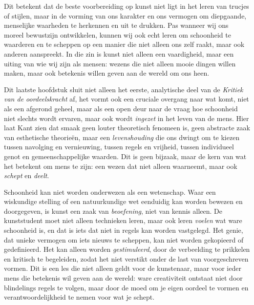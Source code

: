 \begin{mdframed}[leftmargin=0pt,rightmargin=0pt,backgroundcolor=blue!6,linecolor=white,innertopmargin=6pt,innerbottommargin=6pt]
Dit betekent dat de beste voorbereiding op kunst niet ligt in het leren van trucjes of stijlen, maar in de vorming van ons karakter en ons vermogen om diepgaande, menselijke waarheden te herkennen en uit te drukken. Pas wanneer wij ons moreel bewustzijn ontwikkelen, kunnen wij ook echt leren om schoonheid te waarderen en te scheppen op een manier die niet alleen ons zelf raakt, maar ook anderen aanspreekt. In die zin is kunst niet alleen een vaardigheid, maar een uiting van wie wij zijn als mensen: wezens die niet alleen mooie dingen willen maken, maar ook betekenis willen geven aan de wereld om ons heen.

\bigskip
Dit laatste hoofdstuk sluit niet alleen het eerste, analytische deel van de \textit{Kritiek van de oordeelskracht} af, het vormt ook een cruciale overgang naar wat komt, niet als een afgerond geheel, maar als een open deur naar de vraag hoe schoonheid niet slechts wordt ervaren, maar ook wordt \textit{ingezet} in het leven van de mens. Hier laat Kant zien dat smaak geen louter theoretisch fenomeen is, geen abstracte zaak van esthetische theorieën, maar een \textit{levenshouding} die ons dwingt om te kiezen tussen navolging en vernieuwing, tussen regels en vrijheid, tussen individueel genot en gemeenschappelijke waarden. Dit is geen bijzaak, maar de kern van wat het betekent om mens te zijn: een wezen dat niet alleen waarneemt, maar ook \textit{schept} en \textit{deelt}.

Schoonheid kan niet worden onderwezen als een wetenschap. Waar een wiskundige stelling of een natuurkundige wet eenduidig kan worden bewezen en doorgegeven, is kunst een zaak van \textit{beoefening}, niet van kennis alleen. De kunststudent moet niet alleen technieken leren, maar ook leren \textit{voelen} wat ware schoonheid is, en dat is iets dat niet in regels kan worden vastgelegd. Het genie, dat unieke vermogen om iets nieuws te scheppen, kan niet worden gekopieerd of gedefinieerd. Het kan alleen worden \textit{gestimuleerd}, door de verbeelding te prikkelen en kritisch te begeleiden, zodat het niet verstikt onder de last van voorgeschreven vormen. Dit is een les die niet alleen geldt voor de kunstenaar, maar voor ieder mens die betekenis wil geven aan de wereld: ware creativiteit ontstaat niet door blindelings regels te volgen, maar door de moed om je eigen oordeel te vormen en verantwoordelijkheid te nemen voor wat je schept.


\end{mdframed}
